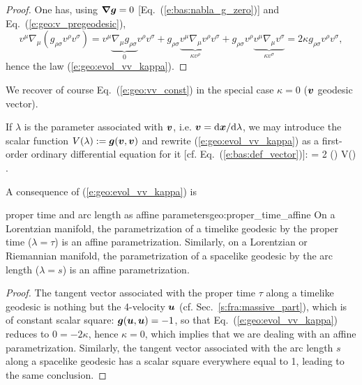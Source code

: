 \begin{proof}
One has, using $\bm{\nabla}\bm{g}=0$ [Eq.~(\ref{e:bas:nabla_g_zero})] and Eq.~(\ref{e:geo:v_pregeodesic}),
\[
    v^\mu \nabla_\mu (g_{\rho\sigma} v^\rho v^\sigma)  = v^\mu \underbrace{\nabla_\mu g_{\rho\sigma}}_{0} v^\rho v^\sigma
                + g_{\rho\sigma} \underbrace{v^\mu \nabla_\mu v^\rho}_{\kappa v^\rho} v^\sigma
                + g_{\rho\sigma} v^\rho \underbrace{v^\mu \nabla_\mu v^\sigma}_{\kappa v^\sigma}
             = 2 \kappa  g_{\rho\sigma} v^\rho v^\sigma  ,
\]
hence the law (\ref{e:geo:evol_vv_kappa}).
\end{proof}
We recover of course Eq.~(\ref{e:geo:vv_const}) in the special case $\kappa = 0$
($\bm{v}$ geodesic vector).
\begin{remark}
If $\lambda$ is the parameter associated with $\bm{v}$, i.e. $\bm{v} = \mathrm{d}\bm{x}/\mathrm{d}\lambda$,
we may introduce the scalar function $V(\lambda) := \bm{g}(\bm{v},\bm{v})$ and
rewrite (\ref{e:geo:evol_vv_kappa}) as a first-order ordinary differential equation
for it [cf. Eq.~(\ref{e:bas:def_vector})]:
\be
     = 2 \kappa(\lambda) V(\lambda) .
\ee
\end{remark}
A consequence of (\ref{e:geo:evol_vv_kappa}) is
\begin{tprop}{proper time and arc length as affine parameters}{geo:proper_time_affine}
On a Lorentzian manifold, the parametrization of a timelike geodesic
by the proper time ($\lambda = \tau$) is an affine parametrization.
Similarly, on a Lorentzian or Riemannian manifold, the parametrization of a
spacelike geodesic
by the arc length ($\lambda = s$) is an affine parametrization.
\end{tprop}

\begin{proof}
The tangent vector associated with the proper time $\tau$ along a timelike geodesic
is nothing but the 4-velocity $\bm{u}$ (cf. Sec.~\ref{s:fra:massive_part}), which
is of constant scalar square: $\bm{g}(\bm{u},\bm{u}) = -1$, so that Eq.~(\ref{e:geo:evol_vv_kappa})
reduces to $0 = -2 \kappa$, hence $\kappa=0$, which implies that we are dealing
with an affine parametrization. Similarly, the tangent vector associated with the
arc length $s$ along a spacelike geodesic has a scalar square everywhere equal
to 1, leading to the same conclusion.
\end{proof}



